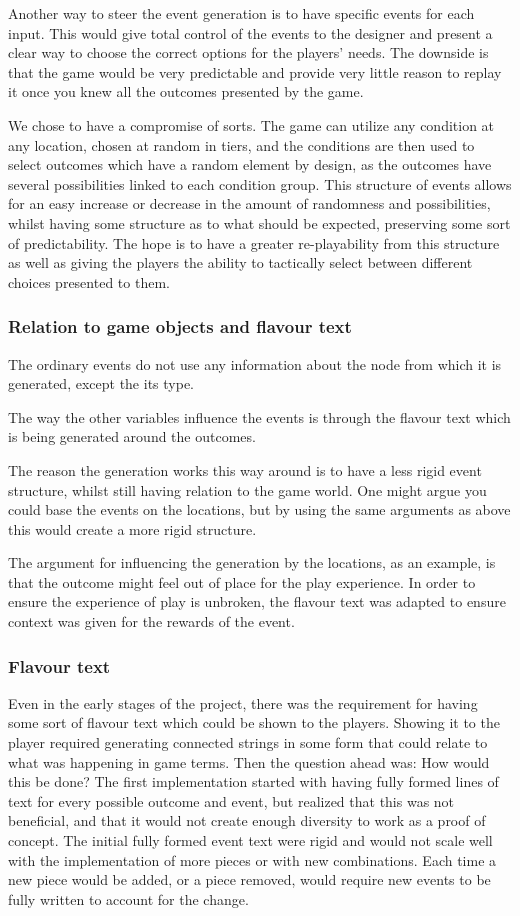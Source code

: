 Another way to steer the event generation is to have specific events for each input. This would give total control of the events to the designer and present a clear way to choose the correct options for the players' needs.
The downside is that the game would be very predictable and provide very little reason to replay it once you knew all the outcomes presented by the game.

We chose to have a compromise of sorts. The game can utilize any condition at any location, chosen at random in tiers, and the conditions are then used to select outcomes which have a random element by design, as the outcomes have several possibilities linked to each condition group.
This structure of events allows for an easy increase or decrease in the amount of randomness and possibilities, whilst having some structure as to what should be expected, preserving some sort of predictability. The hope is to have a greater re-playability from this structure as well as giving the players the ability to tactically select between different choices presented to them.

\subsubsection{Relation to game objects and flavour text}
The ordinary events do not use any information about the node from which it is generated, except the its type. 

The way the other variables influence the events is through the flavour text which is being generated around the outcomes. 

The reason the generation works this way around is to have a less rigid event structure, whilst still having relation to the game world.
One might argue you could base the events on the locations, but by using the same arguments as above this would create a more rigid structure. 

The argument for influencing the generation by the locations, as an example, is that the outcome might feel out of place for the play experience. In order to ensure the experience of play is unbroken, the flavour text was adapted to ensure context was given for the rewards of the event.

\subsubsection{Flavour text}
Even in the early stages of the project, there was the requirement for having some sort of flavour text which could be shown to the players. Showing it to the player required generating connected strings in some form that could relate to what was happening in game terms.
Then the question ahead was: How would this be done?
The first implementation started with having fully formed lines of text for every possible outcome and event, but realized that this was not beneficial, and that it would not create enough diversity to work as a proof of concept. 
The initial fully formed event text were rigid and would not scale well with the implementation of more pieces or with new combinations. Each time a new piece would be added, or a piece removed, would require new events to be fully written to account for the change. 

